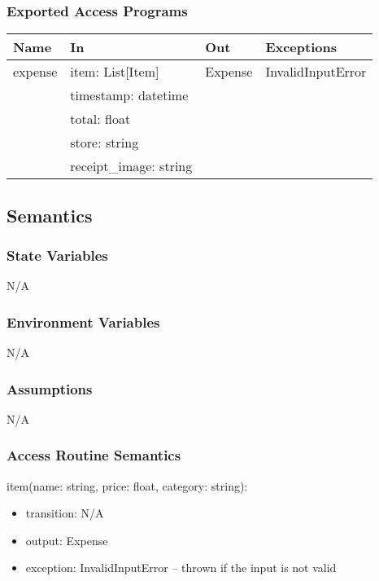 \documentclass[12pt, titlepage]{article}
\begin{document}
\subsubsection{Exported Access Programs}

\begin{center}
\begin{tabular}{p{4cm} p{4cm} p{4cm} p{4cm}}
\hline
\textbf{Name} & \textbf{In} & \textbf{Out} & \textbf{Exceptions} \\
\hline
expense & item: List[Item] & Expense & InvalidInputError \\
  & timestamp: datetime &  &  \\
  & total: float &  &  \\
  & store: string &  &  \\
  & receipt\_image: string &  &  \\
\hline
\end{tabular}
\end{center}

\subsection{Semantics}

\subsubsection{State Variables}
N/A

\subsubsection{Environment Variables}
N/A

\subsubsection{Assumptions}
N/A

\subsubsection{Access Routine Semantics}

\noindent item(name: string, price: float, category: string):
\begin{itemize}
\item transition: N/A
\item output: Expense
\item exception: InvalidInputError -- thrown if the input is not valid
\end{itemize}
\end{document}
